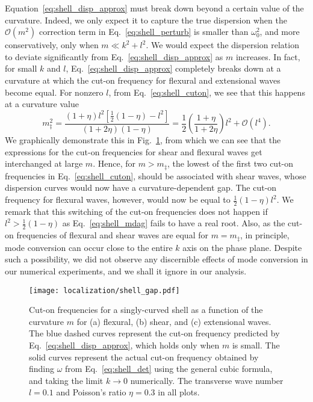Equation~\eqref{eq:shell_disp_approx} must break down beyond a certain value of the curvature.
Indeed, we only expect it to capture the true dispersion when the $\mathcal{O}(m^{2})$ correction term in Eq.~\eqref{eq:shell_perturb} is smaller than $\omega_{0}^{2}$, and more conservatively, only when $m \ll k^{2} + l^{2}$.
We would expect the dispersion relation to deviate significantly from Eq.~\eqref{eq:shell_disp_approx} as $m$ increases.
In fact, for small $k$ and $l$, Eq.~\eqref{eq:shell_disp_approx} completely breaks down at a curvature at which the cut-on frequency for flexural and extensional waves become equal.
For nonzero $l$, from Eq.~\eqref{eq:shell_cuton}, we see that this happens at a curvature value
%
\begin{equation}
  m_{\ddag}^{2} = \frac{(1 + \eta)l^{2}\left[\frac{1}{2}(1 - \eta) - l^{2}\right]}{\left(1 + 2\eta\right)\left(1 - \eta\right)}
  = \frac{1}{2}\left(\frac{1+\eta}{1 + 2\eta}\right)l^{2} + \mathcal{O}(l^{4}).
  \label{eq:shell_mdag}
\end{equation}
%
We graphically demonstrate this in Fig.~\ref{fig:shell_gap}, from which we can see that the expressions for the cut-on frequencies for shear and flexural waves get interchanged at large $m$.
Hence, for $m > m_{\ddag}$, the lowest of the first two cut-on frequencies in Eq.~\eqref{eq:shell_cuton}, should be associated with shear waves, whose dispersion curves would now have a curvature-dependent gap.
The cut-on frequency for flexural waves, however, would now be equal to $\frac{1}{2}(1-\eta)l^{2}$.
We remark that this switching of the cut-on frequencies does not happen if $l^{2} > \frac{1}{2}(1-\eta)$ as Eq.~\eqref{eq:shell_mdag} fails to have a real root.
Also, as the cut-on frequencies of flexural and shear waves are equal for $m = m_{\ddag}$, in principle, mode conversion can occur close to the entire $k$ axis on the phase plane.
Despite such a possibility, we did not observe any discernible effects of mode conversion in our numerical experiments, and we shall it ignore in our analysis.
%
\begin{figure}
  \begin{center}
    \texttt{[image: localization/shell\_gap.pdf]}
  \end{center}
  \caption{%
    Cut-on frequencies for a singly-curved shell as a function of the curvature $m$ for (a) flexural, (b) shear, and (c) extensional waves.
    The blue dashed curves represent the cut-on frequency predicted by Eq.~\eqref{eq:shell_disp_approx}, which holds only when $m$ is small.
    The solid curves represent the actual cut-on frequency obtained by finding $\omega$ from Eq.~\eqref{eq:shell_det} using the general cubic formula, and taking the limit $k \to 0$ numerically.
    The transverse wave number $l = 0.1$ and Poisson's ratio $\eta = 0.3$ in all plots.
  }
  \label{fig:shell_gap}
\end{figure}

